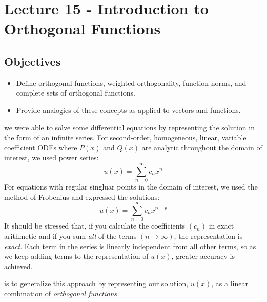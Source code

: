 \chapter{Lecture 15 - Introduction to Orthogonal Functions}
\label{ch:lec15}
\section{Objectives}
\begin{itemize}
\item Define orthogonal functions, weighted orthogonality, function norms, and complete sets of orthogonal functions.
\item Provide analogies of these concepts as applied to vectors and functions.
\end{itemize}

 we were able to solve some differential equations by representing the solution  in the form of an infinite series.  For second-order, homogeneous, linear, variable coefficient ODEs where $P(x)$ and $Q(x)$ are analytic throughout the domain of interest, we used power series:
\begin{equation*}
u(x) = \sum\limits_{n=0}^{\infty}c_nx^n
\end{equation*}
For equations with regular singluar points in the domain of interest, we used the method of Frobenius and expressed the solutions:
\begin{equation*}
u(x) = \sum\limits_{n=0}^{\infty}c_nx^{n+r}
\end{equation*}
It should be stressed that, if you calculate the coefficients $(c_n)$ in exact arithmetic and if you sum \emph{all} of the terms $(n\to \infty)$, the representation is \emph{exact}.  Each term in the series is linearly independent from all other terms, so as we keep adding terms to the representation of $u(x)$, greater accuracy is achieved.  

 is to generalize this approach by representing our solution, $u(x)$, as a linear combination of \emph{orthogonal functions.}


